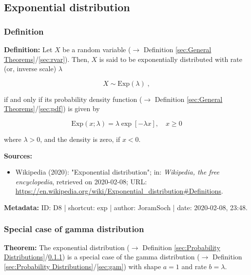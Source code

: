 \documentclass[a4paper,12pt,twoside]{book}
\begin{document}
\subsection{Exponential distribution}

\subsubsection[\textit{Definition}]{Definition} \label{sec:exp}
\setcounter{equation}{0}

\textbf{Definition:} Let $X$ be a random variable ($\rightarrow$ Definition \ref{sec:General Theorems}/\ref{sec:rvar}). Then, $X$ is said to be exponentially distributed with rate (or, inverse scale) $\lambda$

\begin{equation} \label{eq:exp-exp}
X \sim \mathrm{Exp}(\lambda) \; ,
\end{equation}

if and only if its probability density function ($\rightarrow$ Definition \ref{sec:General Theorems}/\ref{sec:pdf}) is given by

\begin{equation} \label{eq:exp-exp-pdf}
\mathrm{Exp}(x; \lambda) = \lambda \exp[-\lambda x], \quad x \geq 0
\end{equation}

where $\lambda > 0$, and the density is zero, if $x < 0$.


\vspace{1em}
\textbf{Sources:}
\begin{itemize}
\item Wikipedia (2020): "Exponential distribution"; in: \textit{Wikipedia, the free encyclopedia}, retrieved on 2020-02-08; URL: \url{https://en.wikipedia.org/wiki/Exponential_distribution#Definitions}.
\end{itemize}


\vspace{1em}
\textbf{Metadata:} ID: D8 | shortcut: exp | author: JoramSoch | date: 2020-02-08, 23:48.
\vspace{1em}



\subsubsection[\textbf{Special case of gamma distribution}]{Special case of gamma distribution} \label{sec:exp-gam}
\setcounter{equation}{0}

\textbf{Theorem:} The exponential distribution ($\rightarrow$ Definition \ref{sec:Probability Distributions}/\ref{sec:exp}) is a special case of the gamma distribution ($\rightarrow$ Definition \ref{sec:Probability Distributions}/\ref{sec:gam}) with shape $a = 1$ and rate $b = \lambda$.
\end{document}
